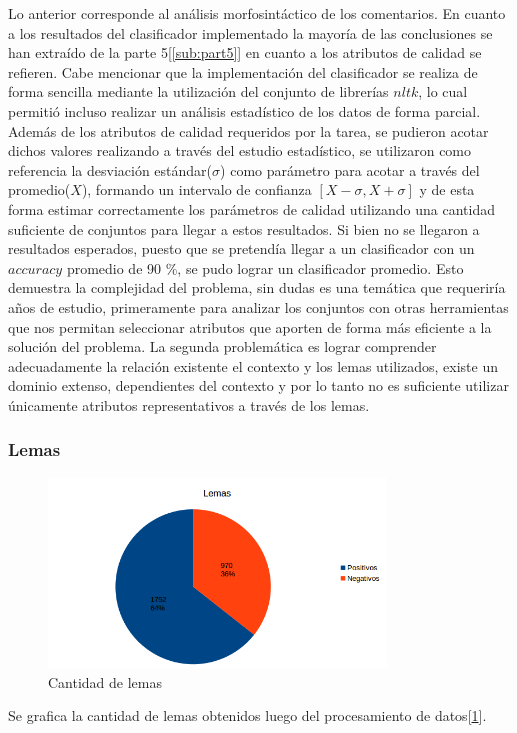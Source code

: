 \documentclass[12pt]{article}
\begin{document}
Lo anterior corresponde al análisis morfosintáctico de los comentarios. En cuanto a los resultados del clasificador implementado la mayoría de las conclusiones se han extraído de la parte 5[\ref{sub:part5}] en cuanto a los atributos de calidad se refieren. Cabe mencionar que la implementación del clasificador se realiza de forma sencilla mediante la utilización del conjunto de librerías $nltk$, lo cual permitió incluso realizar un análisis estadístico de los datos de forma parcial. Además de los atributos de calidad requeridos por la tarea, se pudieron acotar dichos valores realizando a través del estudio estadístico, se utilizaron como referencia la desviación estándar($\sigma$) como parámetro para acotar a través del promedio($X$), formando un intervalo de confianza $[X-\sigma, X+\sigma]$ y de esta forma estimar correctamente los parámetros de calidad utilizando una cantidad suficiente de conjuntos para llegar a estos resultados.
Si bien no se llegaron a resultados esperados, puesto que se pretendía llegar a un clasificador con un $accuracy$ promedio de 90 \%, se pudo lograr un clasificador promedio. Esto demuestra la complejidad del problema, sin dudas es una temática que requeriría años de estudio, primeramente para analizar los conjuntos con otras herramientas que nos permitan seleccionar atributos que aporten de forma más eficiente a la solución del problema. La segunda problemática es lograr comprender adecuadamente la relación existente el contexto y los lemas utilizados, existe un dominio extenso, dependientes del contexto y por lo tanto no es suficiente utilizar únicamente atributos representativos a través de los lemas.




\subsubsection{Lemas}
\begin{figure}[!h]
  \centering
    \includegraphics[width=0.8\textwidth]{./fig/Lemas.png}
  \caption{Cantidad de lemas}
  \label{fig:lemas}
\end{figure} 
Se grafica la cantidad de lemas obtenidos luego del procesamiento de datos[\ref{fig:lemas}].
\end{document}
